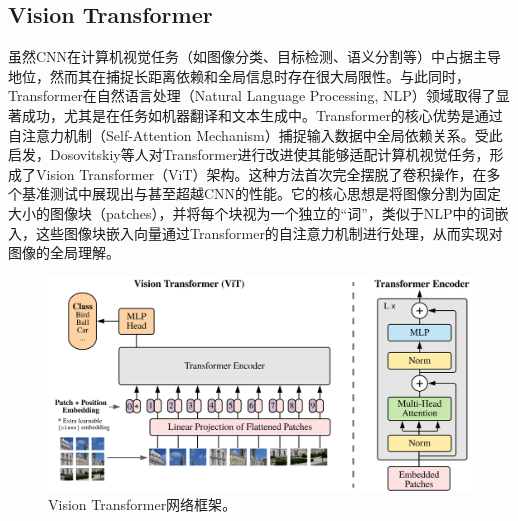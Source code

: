 \documentclass[lang=chs, degree=master, blindreview=false, adobe=false]{yanputhesis}
\begin{document}
\subsection{Vision Transformer}
虽然CNN在计算机视觉任务（如图像分类、目标检测、语义分割等）中占据主导地位，然而其在捕捉长距离依赖和全局信息时存在很大局限性。与此同时，Transformer在自然语言处理（Natural Language Processing, NLP）领域取得了显著成功，尤其是在任务如机器翻译和文本生成中。Transformer的核心优势是通过自注意力机制（Self-Attention Mechanism）捕捉输入数据中全局依赖关系。受此启发，Dosovitskiy等人\cite{dosovitskiy2020vit}对Transformer进行改进使其能够适配计算机视觉任务，形成了Vision Transformer（ViT）架构。这种方法首次完全摆脱了卷积操作，在多个基准测试中展现出与甚至超越CNN的性能。它的核心思想是将图像分割为固定大小的图像块（patches），并将每个块视为一个独立的“词”，类似于NLP中的词嵌入，这些图像块嵌入向量通过Transformer的自注意力机制进行处理，从而实现对图像的全局理解。
\begin{figure}[htb]
  \centering
  \includegraphics[scale=0.55]{images/ViT.png}
  \caption{
    Vision Transformer网络框架\cite{dosovitskiy2020vit}。
  }
  \label{fig:ViT}
\end{figure}
\end{document}
